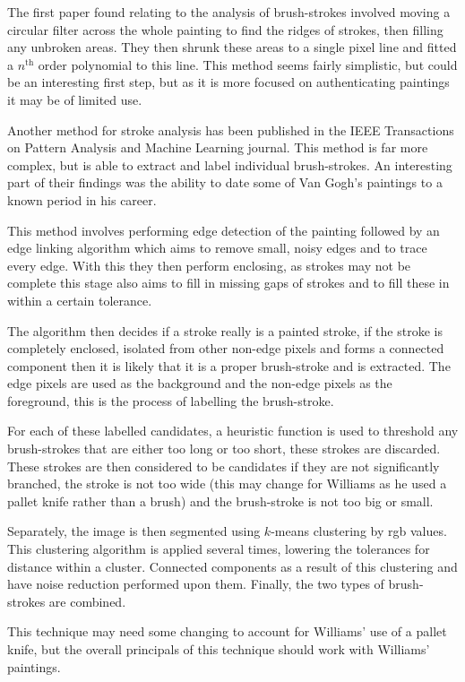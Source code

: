 The first paper found relating to the analysis of brush-strokes involved moving a circular filter
across the whole painting to find the ridges of strokes, then filling any unbroken areas. They then
shrunk these areas to a single pixel line and fitted a $n^{\text{th}}$ order polynomial to this
line\cite{Berezhnoy2005Authentic}. This method seems fairly simplistic, but could be an interesting
first step, but as it is more focused on authenticating paintings it may be of limited use.

Another method for stroke analysis has been published in the IEEE Transactions on Pattern Analysis
and Machine Learning journal. This method is far more complex, but is able to extract and label
individual brush-strokes. An interesting part of their findings was the ability to date some of Van
Gogh's paintings to a known period in his career\cite{Li2012Rhythmic}.

This method involves performing edge detection of the painting followed by an edge linking 
algorithm which aims to remove small, noisy edges and to trace every edge. With this they then
perform enclosing, as strokes may not be complete this stage also aims to fill in missing gaps of
strokes and to fill these in within a certain tolerance.

The algorithm then decides if a stroke really is a painted stroke, if the stroke is completely 
enclosed, isolated from other non-edge pixels and forms a connected component then it is likely 
that it is a proper brush-stroke and is extracted. The edge pixels are used as the background and
the non-edge pixels as the foreground, this is the process of labelling the brush-stroke.

For each of these labelled candidates, a heuristic function is used to threshold any brush-strokes 
that are either too long or too short, these strokes are discarded. These strokes are then
considered to be candidates if they are not significantly branched, the stroke is not too wide 
(this may change for Williams as he used a pallet knife rather than a brush) and the 
brush-stroke is not too big or small.

Separately, the image is then segmented using $k$-means clustering by \gls{rgb} values. This clustering 
algorithm is applied several times, lowering the tolerances for distance within a cluster. 
Connected components as a result of this clustering and have noise reduction performed upon them.
Finally, the two types of brush-strokes are combined.

This technique may need some changing to account for Williams' use of a pallet knife, but
the overall principals of this technique should work with Williams' paintings.


